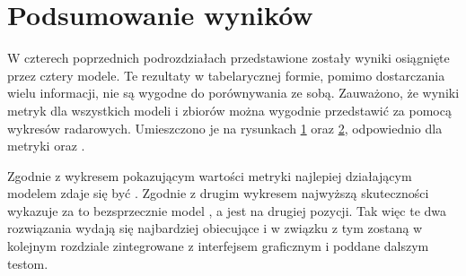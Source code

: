 \section{Podsumowanie wyników}
W czterech poprzednich podrozdziałach przedstawione zostały wyniki osiągnięte przez cztery modele. Te rezultaty w tabelarycznej formie, pomimo dostarczania wielu informacji, nie są wygodne do porównywania ze sobą. Zauważono, że wyniki metryk dla wszystkich modeli i zbiorów można wygodnie przedstawić za pomocą wykresów radarowych. Umieszczono je na rysunkach \ref{fig:experiments-em} oraz \ref{fig:experiments-ex}, odpowiednio dla metryki  oraz .

Zgodnie z wykresem pokazującym wartości metryki  najlepiej działającym modelem zdaje się być . Zgodnie z drugim wykresem najwyższą skuteczności wykazuje za to bezsprzecznie model , a  jest na drugiej pozycji. Tak więc te dwa rozwiązania wydają się najbardziej obiecujące i w związku z tym zostaną w kolejnym rozdziale zintegrowane z interfejsem graficznym i poddane dalszym testom.

\begin{figure}[H]
  \centering
  
  \label{fig:experiments-em}
\end{figure}

\begin{figure}[H]
  \centering
  
  \label{fig:experiments-ex}
\end{figure}
